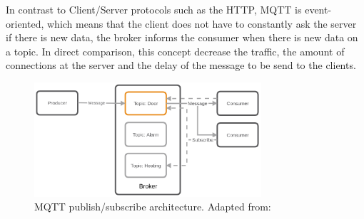 In contrast to Client/Server protocols such as the \acs{HTTP}, \ac{MQTT} is event-oriented, which means that the client does not have to constantly ask the server if there is new data, the broker informs the consumer when there is new data on a topic.\autocite[cf.]{Bayer:MQTT}
In direct comparison, this concept decrease the traffic, the amount of connections at the server and the delay of the message to be send to the clients.

\begin{figure}[H]
    \centering
    \includegraphics[width=0.75\textwidth]{resources/images/mqtt_architecture.png}
    \caption[MQTT publish/subscribe architecture]{MQTT publish/subscribe architecture. Adapted from: \autocite{Bayer:MQTT}}
    \label{fig:mqtt_architecture}
\end{figure}

